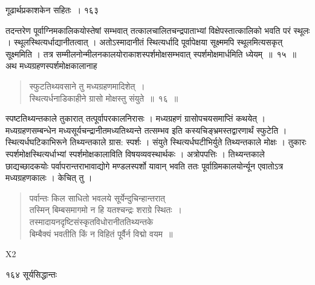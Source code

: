 \documentclass[11pt, openany]{book}
\begin{document}
\newpage


\hspace{3cm}  गूढार्थप्रकाशकेन सहितः~। \hfill १६३
\vspace{1cm}

\begin{sloppypar}
तदन्तरेण पूर्वाग्निमकालिकयोस्तेषां सम्भवात् तत्कालचालितचन्द्रपाताभ्यां विक्षेपस्तात्कालिको भवति परं स्थूलः । स्थूलस्थित्यर्धाद्यानीतत्वात् । अतोऽस्मादानीतं स्थित्यर्धादि पूर्वापेक्षया सूक्ष्ममपि स्थूलमित्यसकृत् सूक्ष्ममिति । तत्र सम्मीलनोन्मीलनकालयोराकाशस्पर्शमोक्षसम्भवात् स्पर्शमोक्षमार्धमिति ध्येयम्~॥~१५~॥\\
\noindent अथ मध्यग्रहणस्पर्शमोक्षकालानाह\textendash
\end{sloppypar}


\begin{quote}
  {\ssi स्फुटतिथ्यवसाने तु मध्यग्रहणमादिशेत्~।\\
स्थित्यर्धनाडिकाहीने ग्रासो मोक्षस्तु संयुते~॥~१६~॥}
\end{quote}

\begin{sloppypar}
स्पष्टतिथ्यन्तकाले तुकारात् तत्पूर्वापरकालनिरासः । मध्यग्रहणं ग्रासोपचयसमाप्तिं कथयेत् । मध्यग्रहणसम्बन्धेन मध्यसूर्यचन्द्रानीतमध्यतिथ्यन्ते तत्सम्भव इति कस्यचिङ्भ्रमस्तद्वारणार्थं स्फुटेति । स्थित्यर्धघटिकाभिरूने तिथ्यन्तकाले ग्रास: स्पर्शः । संयुते स्थित्यर्धघटीभिर्युते तिथ्यन्तकाले मोक्षः । तुकारः स्पर्शमोक्षस्थित्यर्धाभ्यां स्पर्शमोक्षकालाविति विषयव्यवस्थार्थकः । अत्रोपपत्तिः । तिथ्यन्तकाले छाद्यच्छादकयोः पर्वापरान्तराभावाद्योगे मण्डलस्पर्शो यावान् भवति ततः पूर्वाग्रिमकालयोर्न्यून एवातोऽत्र मध्यग्रहणकालः । केचित् तु ।
\end{sloppypar}
\begin{quote}
{\qt पर्वान्तः किल साधितो भवलये सूर्येन्दुचिन्हान्तरात्\\
तस्मिन् बिम्बसमागमो न हि यतश्चन्द्रः शराग्रे स्थितः~।\\
तस्मादायनदृष्टिसंस्कृतविधोरानीततिथ्यन्तके\\
बिम्बैक्यं भवतीति किं न विहितं पूर्वैर्न विद्मो वयम~॥}
\end{quote}


{\tiny{X2}}

\newpage

\noindent १६४ \hspace{4cm} सूर्यसिद्धान्तः
\vspace{1cm}
\end{document}
